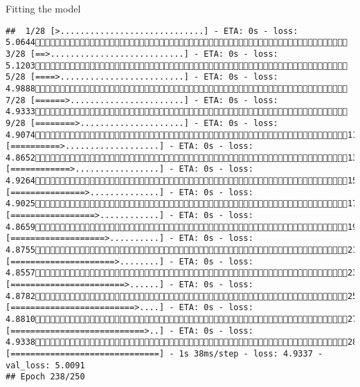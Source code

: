 \documentclass[
  ignorenonframetext,
]{beamer}
\begin{document}
\begin{frame}[fragile]{Fitting the model}
\begin{verbatim}
##  1/28 [>.............................] - ETA: 0s - loss: 5.0644 3/28 [==>...........................] - ETA: 0s - loss: 5.1203 5/28 [====>.........................] - ETA: 0s - loss: 4.9888 7/28 [======>.......................] - ETA: 0s - loss: 4.9333 9/28 [========>.....................] - ETA: 0s - loss: 4.907411/28 [==========>...................] - ETA: 0s - loss: 4.865213/28 [============>.................] - ETA: 0s - loss: 4.926415/28 [===============>..............] - ETA: 0s - loss: 4.902517/28 [=================>............] - ETA: 0s - loss: 4.865919/28 [===================>..........] - ETA: 0s - loss: 4.875521/28 [=====================>........] - ETA: 0s - loss: 4.855723/28 [=======================>......] - ETA: 0s - loss: 4.878225/28 [=========================>....] - ETA: 0s - loss: 4.881027/28 [===========================>..] - ETA: 0s - loss: 4.933828/28 [==============================] - 1s 38ms/step - loss: 4.9337 - val_loss: 5.0091
## Epoch 238/250

\end{verbatim}
\end{frame}
\end{document}
